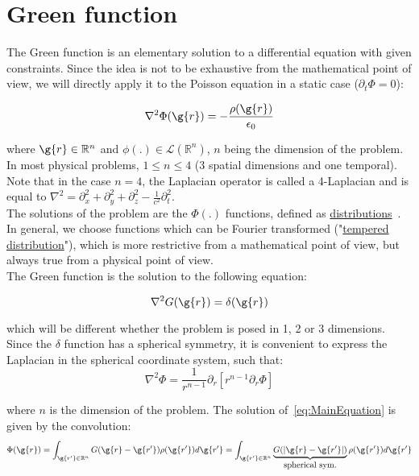 \chapter{Green function}
\label{ch:Green function}

The Green function is an elementary solution to a differential equation with given constraints. Since the idea is not to be exhaustive from the mathematical point of view, we will directly apply it to the Poisson equation in a static case ($\partial_t \Phi = 0$):

\begin{equation}
\label{eq:MainEquation}
\nabla^2 \Phi(\g{r}) = -\frac{\rho(\g{r})}{\epsilon_0}
\end{equation}

\noindent where $\g{r}\in \mathbb{R}^n$ and $\phi(.)\in\mathcal{L}(\mathbb{R}^n)$, $n$ being the dimension of the problem. In most physical problems, $1\le n\le4$ (3 spatial dimensions and one temporal). Note that in the case $n=4$, the Laplacian operator is called a 4-Laplacian and is equal to $\nabla^2 = \partial_x^2+\partial_y^2+\partial_z^2 - \frac{1}{c^2}\partial_t^2$. \\

\noindent The solutions of the problem are the $\Phi (.)$ functions, defined as \underline{distributions}~\cite{strichartz2003guide}. In general, we choose functions which can be Fourier transformed ("\underline{tempered distribution}"), which is more restrictive from a mathematical point of view, but always true from a physical point of view.\\


\noindent The Green function is the solution to the following equation:

\begin{equation}
\nabla^2 G(\g{r}) = \delta(\g{r})
\label{eq:greenEq}
\end{equation}

\noindent which will be different whether the problem is posed in 1, 2 or 3 dimensions. Since the $\delta$ function has a spherical symmetry, it is convenient to express the Laplacian in the spherical coordinate system, such that:
$$
\nabla^2 \Phi = \frac{1}{r^{n-1}}\partial_r[r^{n-1}\partial_r \Phi]
$$

\noindent where $n$ is the dimension of the problem. The solution of~\ref{eq:MainEquation} is given by the convolution: 
$$
\Phi(\g{r}) = \int_{\g{r'}\in\mathbb{R}^n}G(\g{r}-\g{r'})\rho(\g{r'})d\g{r'} =
 \int_{\g{r'}\in\mathbb{R}^n}\underbrace{G(|\g{r}-\g{r'}|)}_{\mbox{spherical sym.}}\rho(\g{r'})d\g{r'}  
 $$\\

